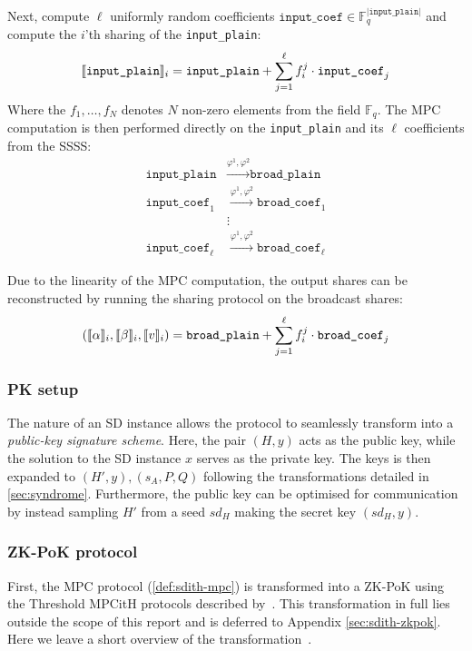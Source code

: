 \documentclass[11pt]{report}
\theoremstyle{definition}
\theoremstyle{plain}
\begin{document}
Next, compute $\ell$ uniformly random coefficients $\texttt{input\_coef} \in \mathbb{F}_q^{|\texttt{input\_plain}|}$ and compute the $i$'th sharing of the \texttt{input\_plain}:
\begin{align}\label{equation:input_sharing}
  \llbracket \texttt{input\_plain} \rrbracket_i = \texttt{input\_plain} + \sum_{j=1}^\ell f_i^j \cdot \texttt{input\_coef}_j
\end{align}
Where the $f_1,\dots,f_N$ denotes $N$ non-zero elements from the field $\mathbb{F}_q$.
The MPC computation is then performed directly on the \texttt{input\_plain} and its $\ell$ coefficients from the SSSS:
\begin{align*}
  \texttt{input\_plain}     & \stackrel{\varphi^1, \varphi^2}{\longrightarrow} \texttt{broad\_plain}     \\
  \texttt{input\_coef}_1    & \stackrel{\varphi^1, \varphi^2}{\longrightarrow} \texttt{broad\_coef}_1    \\
                            & \vdots                                                                     \\
  \texttt{input\_coef}_\ell & \stackrel{\varphi^1, \varphi^2}{\longrightarrow} \texttt{broad\_coef}_\ell
\end{align*}

Due to the linearity of the MPC computation, the output shares can be reconstructed by running the sharing protocol on the broadcast shares:
\begin{align}\label{equation:input_sharing_reverse}
  (\llbracket \alpha \rrbracket_i, \llbracket \beta \rrbracket_i, \llbracket v \rrbracket_i) = \texttt{broad\_plain} + \sum_{j=1}^\ell f_i^j \cdot \texttt{broad\_coef}_j
\end{align}

\subsubsection{PK setup}
The nature of an SD instance allows the protocol to seamlessly transform into a \textit{public-key signature scheme}. Here, the pair $(H, y)$ acts as the public key, while the solution to the SD instance $x$ serves as the private key. The keys is then expanded to $(H', y), (s_A, P, Q)$ following the transformations detailed in \autoref{sec:syndrome}. Furthermore, the public key can be optimised for communication by instead sampling $H'$ from a seed $sd_H$ making the secret key $(sd_H, y)$.

\subsubsection{ZK-PoK protocol}
First, the MPC protocol (\autoref{def:sdith-mpc}) is transformed into a ZK-PoK using the Threshold MPCitH protocols described by~\cite{feneuil2023threshold,feneuil2023threshold2}. This transformation in full lies outside the scope of this report and is deferred to Appendix \ref{sec:sdith-zkpok}. Here we leave a short overview of the transformation~\cite{aguilarsyndrome11}.
\end{document}

